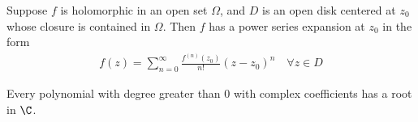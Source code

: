 \documentclass[thmcnt=section, color=cyan, 12pt]{my-elegantbook}
\begin{document}
\begin{theorem} \label{thm:13}
    Suppose $f$ is holomorphic in an open set $\Omega$, and $D$ is an open disk
    centered at $z_0$ whose closure is contained in $\Omega$. Then $f$ has a power
    series expansion at $z_0$ in the form
    \begin{align}
        f(z) = \sum_{n=0}^\infty \frac{f^{(n)}(z_0)}{n!}  (z - z_0)^n \quad \forall z \in D
        \label{eq:45}
    \end{align}
\end{theorem}

\begin{theorem} \label{thm:11}
\end{theorem}

\begin{theorem} \label{thm:12}
    Every polynomial with degree greater than $0$ with complex coefficients has a
    root in $\C$.
\end{theorem}
\end{document}
